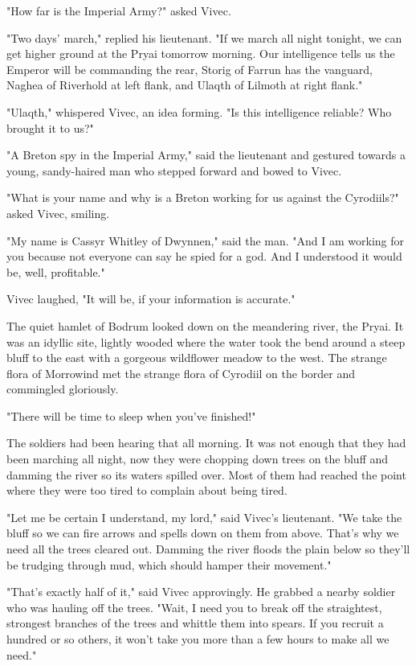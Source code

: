 "How far is the Imperial Army?" asked Vivec.

"Two days' march," replied his lieutenant. "If we march all night tonight, we can get higher ground at the Pryai tomorrow morning. Our intelligence tells us the Emperor will be commanding the rear, Storig of Farrun has the vanguard, Naghea of Riverhold at left flank, and Ulaqth of Lilmoth at right flank."

"Ulaqth," whispered Vivec, an idea forming. "Is this intelligence reliable? Who brought it to us?"

"A Breton spy in the Imperial Army," said the lieutenant and gestured towards a young, sandy-haired man who stepped forward and bowed to Vivec.

"What is your name and why is a Breton working for us against the Cyrodiils?" asked Vivec, smiling.

"My name is Cassyr Whitley of Dwynnen," said the man. "And I am working for you because not everyone can say he spied for a god. And I understood it would be, well, profitable."

Vivec laughed, "It will be, if your information is accurate."

The quiet hamlet of Bodrum looked down on the meandering river, the Pryai. It was an idyllic site, lightly wooded where the water took the bend around a steep bluff to the east with a gorgeous wildflower meadow to the west. The strange flora of Morrowind met the strange flora of Cyrodiil on the border and commingled gloriously.

"There will be time to sleep when you've finished!"

The soldiers had been hearing that all morning. It was not enough that they had been marching all night, now they were chopping down trees on the bluff and damming the river so its waters spilled over. Most of them had reached the point where they were too tired to complain about being tired.

"Let me be certain I understand, my lord," said Vivec's lieutenant. "We take the bluff so we can fire arrows and spells down on them from above. That's why we need all the trees cleared out. Damming the river floods the plain below so they'll be trudging through mud, which should hamper their movement."

"That's exactly half of it," said Vivec approvingly. He grabbed a nearby soldier who was hauling off the trees. "Wait, I need you to break off the straightest, strongest branches of the trees and whittle them into spears. If you recruit a hundred or so others, it won't take you more than a few hours to make all we need."

